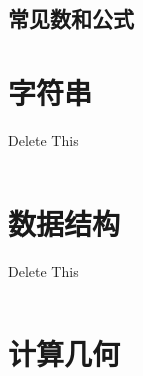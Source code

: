 \documentclass[twoside]{article}
\begin{document}
\subsection{常见数和公式}
\clearpage\section{字符串}
Delete This
\begin{lstlisting}
\end{lstlisting}
\clearpage\section{数据结构}
Delete This
\begin{lstlisting}
\end{lstlisting}
\clearpage\section{计算几何}
\end{document}
